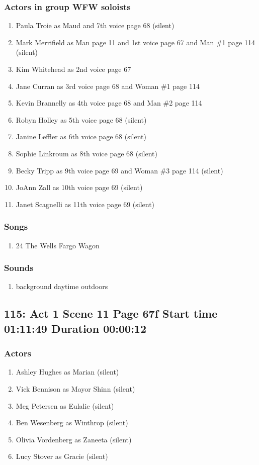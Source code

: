 \subsubsection{Actors in group WFW soloists}
\begin{enumerate}
\item Paula Troie as Maud and 7th voice page 68 (silent)
\item Mark Merrifield as Man page 11 and 1st voice page 67 and Man \#1 page 114 (silent)
\item Kim Whitehead as 2nd voice page 67
\item Jane Curran as 3rd voice page 68 and Woman \#1 page 114
\item Kevin Brannelly as 4th voice page 68 and Man \#2 page 114
\item Robyn Holley as 5th voice page 68 (silent)
\item Janine Leffler as 6th voice page 68 (silent)
\item Sophie Linkroum as 8th voice page 68 (silent)
\item Becky Tripp as 9th voice page 69 and Woman \#3 page 114 (silent)
\item JoAnn Zall as 10th voice page 69 (silent)
\item Janet Scagnelli as 11th voice page 69 (silent)
\end{enumerate}

\subsubsection{Songs}
\begin{enumerate}
\item 24 The Wells Fargo Wagon
\end{enumerate}\subsubsection{Sounds}
\begin{enumerate}
\item background daytime outdoors
\end{enumerate}
\subsection{115: Act 1 Scene 11 Page 67f Start time 01:11:49 Duration 00:00:12}

\subsubsection{Actors}
\begin{enumerate}
\item Ashley Hughes as Marian (silent)
\item Vick Bennison as Mayor Shinn (silent)
\item Meg Petersen as Eulalie (silent)
\item Ben Wesenberg as Winthrop (silent)
\item Olivia Vordenberg as Zaneeta (silent)
\item Lucy Stover as Gracie (silent)
\end{enumerate}
